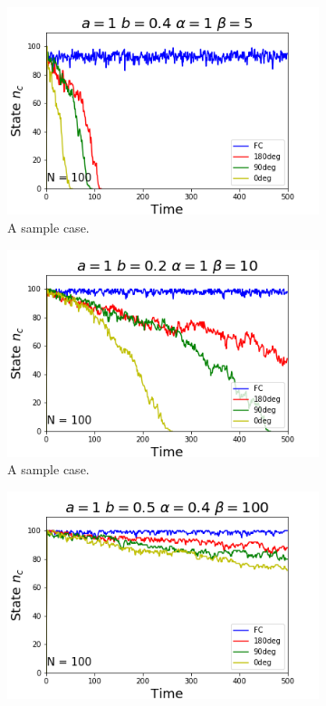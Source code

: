 \begin{figure}[h]
  \centering
  \begin{subfigure}[b]{0.3\linewidth}
    \includegraphics[width=\linewidth]{images/chapter4/feedback_sim4.png}
    \caption{A sample case.}
  \end{subfigure}
  \begin{subfigure}[b]{0.3\linewidth}
    \includegraphics[width=\linewidth]{images/chapter4/feedback_sim5.png}
    \caption{A sample case.}
  \end{subfigure}
    \begin{subfigure}[b]{0.3\linewidth}
    \includegraphics[width=\linewidth]{images/chapter4/feedback_sim6.png}

\end{subfigure}
\end{figure}
